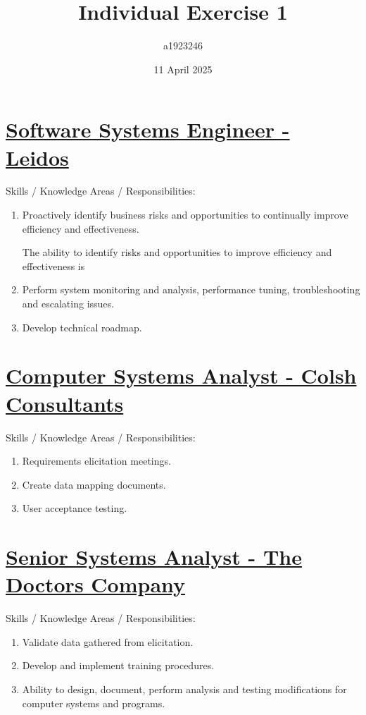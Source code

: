 \documentclass{article}
\title{\huge{Individual Exercise 1}}
\author{a1923246}
\date{11 April 2025}
\begin{document}
\maketitle

\section*{\href{https://www.indeed.com/viewjob?jk=908737a36bc71cb1&tk=1imgqr83ih3lj87f&from=serp&vjs=3}{Software Systems Engineer - Leidos}}
Skills / Knowledge Areas / Responsibilities:
\begin{enumerate}
  \item Proactively identify business risks and opportunities to continually improve efficiency and effectiveness.

    The ability to identify risks and opportunities to improve efficiency and effectiveness is 
  \item Perform system monitoring and analysis, performance tuning, troubleshooting and escalating issues.
  \item Develop technical roadmap.
\end{enumerate}
\section*{\href{https://www.indeed.com/viewjob?jk=87412bfc60da0902&tk=1imgqr83ih3lj87f&from=serp&vjs=3}{Computer Systems Analyst - Colsh Consultants}}
Skills / Knowledge Areas / Responsibilities:
\begin{enumerate}
  \item Requirements elicitation meetings.
  \item Create data mapping documents.
  \item User acceptance testing.
\end{enumerate}
\section*{\href{https://www.indeed.com/viewjob?jk=53f0064d58771bd4&tk=1imgqnkk4i0j484t&from=serp&vjs=3}{Senior Systems Analyst - The Doctors Company}}
Skills / Knowledge Areas / Responsibilities:
\begin{enumerate}
  \item Validate data gathered from elicitation.
  \item Develop and implement training procedures.
  \item Ability to design, document, perform analysis and testing modifications for computer systems and programs.
\end{enumerate}
\end{document}
